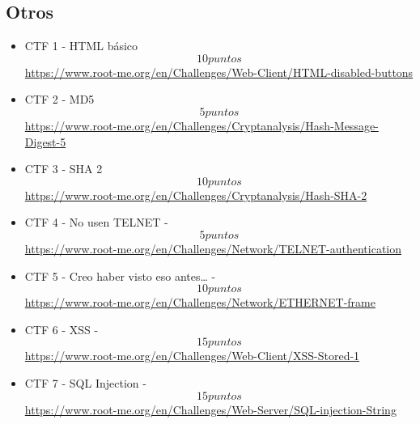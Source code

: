 \subsection{Otros}
\begin{flushright}
    \textit{ }
\end{flushright}
\begin{itemize}
\item CTF 1 - HTML básico \[10 puntos\]
\url{https://www.root-me.org/en/Challenges/Web-Client/HTML-disabled-buttons}

\item CTF 2 - MD5 \[5 puntos\]
\url{https://www.root-me.org/en/Challenges/Cryptanalysis/Hash-Message-Digest-5}

\item CTF 3 - SHA 2 \[10 puntos\]
\url{https://www.root-me.org/en/Challenges/Cryptanalysis/Hash-SHA-2}

\item CTF 4 - No usen TELNET - \[5 puntos\]
\url{https://www.root-me.org/en/Challenges/Network/TELNET-authentication}

\item CTF 5 - Creo haber visto eso antes… - \[10 puntos\]
\url{https://www.root-me.org/en/Challenges/Network/ETHERNET-frame}

\item CTF 6 - XSS - \[15 puntos\]
\url{https://www.root-me.org/en/Challenges/Web-Client/XSS-Stored-1}

\item CTF 7 - SQL Injection - \[15 puntos\]
\url{https://www.root-me.org/en/Challenges/Web-Server/SQL-injection-String}
\end{itemize}
